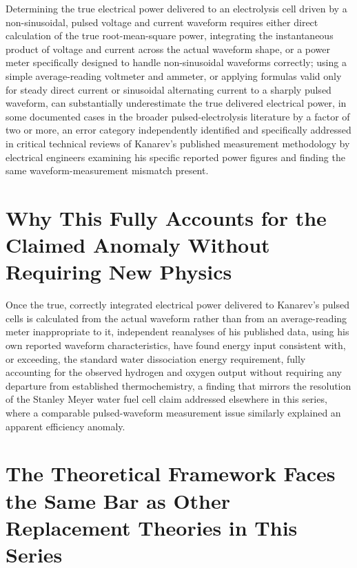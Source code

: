 \documentclass[11pt]{article}
\begin{document}
Determining the true electrical power delivered to an electrolysis cell driven by a non-sinusoidal, pulsed voltage and current waveform requires either direct calculation of the true root-mean-square power, integrating the instantaneous product of voltage and current across the actual waveform shape, or a power meter specifically designed to handle non-sinusoidal waveforms correctly; using a simple average-reading voltmeter and ammeter, or applying formulas valid only for steady direct current or sinusoidal alternating current to a sharply pulsed waveform, can substantially underestimate the true delivered electrical power, in some documented cases in the broader pulsed-electrolysis literature by a factor of two or more, an error category independently identified and specifically addressed in critical technical reviews of Kanarev's published measurement methodology by electrical engineers examining his specific reported power figures and finding the same waveform-measurement mismatch present.

\section{Why This Fully Accounts for the Claimed Anomaly Without Requiring New Physics}

Once the true, correctly integrated electrical power delivered to Kanarev's pulsed cells is calculated from the actual waveform rather than from an average-reading meter inappropriate to it, independent reanalyses of his published data, using his own reported waveform characteristics, have found energy input consistent with, or exceeding, the standard water dissociation energy requirement, fully accounting for the observed hydrogen and oxygen output without requiring any departure from established thermochemistry, a finding that mirrors the resolution of the Stanley Meyer water fuel cell claim addressed elsewhere in this series, where a comparable pulsed-waveform measurement issue similarly explained an apparent efficiency anomaly.

\section{The Theoretical Framework Faces the Same Bar as Other Replacement Theories in This Series}
\end{document}
